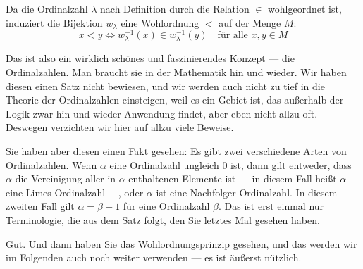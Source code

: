 \begin{math-stroke}

\begin{explanation-of-steps}
Da die Ordinalzahl $\lambda$ nach Definition durch die Relation $\in$ wohlgeordnet ist, induziert die Bijektion $w_\lambda$ eine Wohlordnung $<$ auf der Menge $M$:
\[
x < y \iff w_\lambda^{-1}(x) \in w_\lambda^{-1}(y) \quad \text{für alle } x, y \in M
\]
\end{explanation-of-steps}
\end{math-stroke}

\begin{spoken-clean}[00:22:24 - 00:24:41]
Das ist also ein wirklich schönes und faszinierendes Konzept --- die Ordinalzahlen. Man braucht sie in der Mathematik hin und wieder. Wir haben diesen einen Satz nicht bewiesen, und wir werden auch nicht zu tief in die Theorie der Ordinalzahlen einsteigen, weil es ein Gebiet ist, das außerhalb der Logik zwar hin und wieder Anwendung findet, aber eben nicht allzu oft. Deswegen verzichten wir hier auf allzu viele Beweise.

Sie haben aber diesen einen Fakt gesehen: Es gibt zwei verschiedene Arten von Ordinalzahlen. Wenn $\alpha$ eine Ordinalzahl ungleich $0$ ist, dann gilt entweder, dass $\alpha$ die Vereinigung aller in $\alpha$ enthaltenen Elemente ist --- in diesem Fall heißt $\alpha$ eine Limes-Ordinalzahl ---, oder $\alpha$ ist eine Nachfolger-Ordinalzahl. In diesem zweiten Fall gilt $\alpha = \beta + 1$ für eine Ordinalzahl $\beta$. Das ist erst einmal nur Terminologie, die aus dem Satz folgt, den Sie letztes Mal gesehen haben.

Gut. Und dann haben Sie das Wohlordnungsprinzip gesehen, und das werden wir im Folgenden auch noch weiter verwenden --- es ist äußerst nützlich.
\end{spoken-clean}

\begin{math-stroke}
\end{math-stroke}

